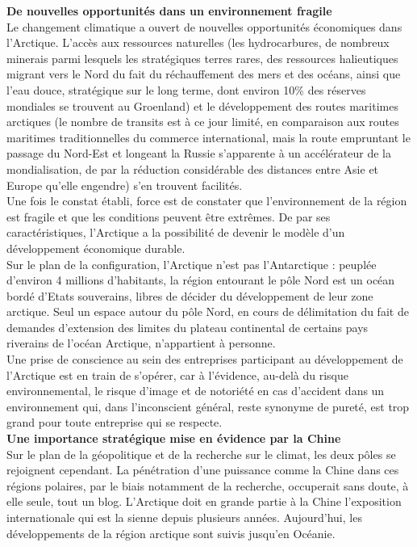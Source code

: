 \documentclass[8pt]{article}
\begin{document}
\textbf{De nouvelles opportunités dans un environnement fragile}\\

Le changement climatique a ouvert de nouvelles opportunités économiques dans l’Arctique. L’accès aux ressources naturelles (les hydrocarbures, de nombreux minerais parmi lesquels les stratégiques terres rares, des ressources halieutiques migrant vers le Nord du fait du réchauffement des mers et des océans, ainsi que l’eau douce, stratégique sur le long terme, dont environ 10\% des réserves mondiales se trouvent au Groenland) et le développement des routes maritimes arctiques (le nombre de transits est à ce jour limité, en comparaison aux routes maritimes traditionnelles du commerce international, mais la route empruntant le passage du Nord-Est et longeant la Russie s’apparente à un accélérateur de la mondialisation, de par la réduction considérable des distances entre Asie et Europe qu’elle engendre) s’en trouvent facilités.\\

Une fois le constat établi, force est de constater que l’environnement de la région est fragile et que les conditions peuvent être extrêmes. De par ses caractéristiques, l’Arctique a la possibilité de devenir le modèle d’un développement économique durable.\\

Sur le plan de la configuration, l’Arctique n’est pas l’Antarctique : peuplée d’environ 4 millions d’habitants, la région entourant le pôle Nord est un océan bordé d’Etats souverains, libres de décider du développement de leur zone arctique. Seul un espace autour du pôle Nord, en cours de délimitation du fait de demandes d’extension des limites du plateau continental de certains pays riverains de l’océan Arctique, n’appartient à personne.\\

Une prise de conscience au sein des entreprises participant au développement de l’Arctique est en train de s’opérer, car à l’évidence, au-delà du risque environnemental, le risque d’image et de notoriété en cas d’accident dans un environnement qui, dans l’inconscient général, reste synonyme de pureté, est trop grand pour toute entreprise qui se respecte.\\

\textbf{Une importance stratégique mise en évidence par la Chine}\\

Sur le plan de la géopolitique et de la recherche sur le climat, les deux pôles se rejoignent cependant. La pénétration d’une puissance comme la Chine dans ces régions polaires, par le biais notamment de la recherche, occuperait sans doute, à elle seule, tout un blog. L’Arctique doit en grande partie à la Chine l’exposition internationale qui est la sienne depuis plusieurs années. Aujourd’hui, les développements de la région arctique sont suivis jusqu’en Océanie.\\
\end{document}
